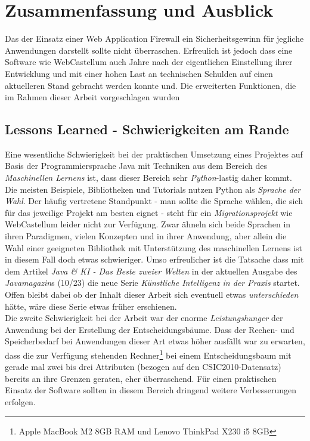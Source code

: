 \chapter{Zusammenfassung und Ausblick}



Das der Einsatz einer Web Application Firewall ein Sicherheitsgewinn für jegliche Anwendungen darstellt sollte nicht überraschen. Erfreulich ist jedoch dass eine Software wie WebCastellum auch Jahre nach der eigentlichen Einstellung ihrer Entwicklung und mit einer hohen Last an technischen Schulden auf einen aktuelleren Stand gebracht werden konnte und. Die erweiterten Funktionen, die im Rahmen dieser Arbeit vorgeschlagen wurden

\section{Lessons Learned - Schwierigkeiten am Rande}
Eine wesentliche Schwierigkeit bei der praktischen Umsetzung eines Projektes auf Basis der Programmiersprache Java mit Techniken aus dem Bereich des \emph{Maschinellen Lernens} ist, dass dieser Bereich sehr \glqq\emph{Python}\grqq-lastig daher kommt. Die meisten Beispiele, Bibliotheken und Tutorials nutzen Python als \emph{Sprache der Wahl}. Der häufig vertretene Standpunkt - man sollte die Sprache wählen, die sich für das jeweilige Projekt am besten eignet - steht für ein \emph{Migrationsprojekt} wie WebCastellum leider nicht zur Verfügung. Zwar ähneln sich beide Sprachen in ihren Paradigmen, vielen Konzepten und in ihrer Anwendung, aber allein die Wahl einer geeigneten Bibliothek mit Unterstützung des maschinellen Lernens ist in diesem Fall doch etwas schwieriger. Umso erfreulicher ist die Tatsache dass mit dem Artikel \glqq\emph{Java \& KI - Das Beste zweier Welten}\grqq{} in der aktuellen Ausgabe des \emph{Javamagazin}s (10/23) die neue Serie \glqq\emph{Künstliche Intelligenz in der Praxis}\grqq{} startet. Offen bleibt dabei ob der Inhalt dieser Arbeit sich eventuell etwas \emph{unterschieden} hätte, wäre diese Serie etwas früher erschienen.\\

Die zweite Schwierigkeit bei der Arbeit war der enorme \emph{Leistungshunger} der Anwendung bei der Erstellung der Entscheidungsbäume. Dass der Rechen- und Speicherbedarf bei Anwendungen dieser Art etwas höher ausfällt war zu erwarten, dass die zur Verfügung stehenden Rechner\footnote{Apple MacBook M2 8GB RAM und Lenovo ThinkPad X230 i5 8GB} bei einem Entscheidungsbaum mit gerade mal zwei bis drei Attributen (bezogen auf den CSIC2010-Datensatz) bereits an ihre Grenzen geraten, eher überraschend. Für einen praktischen Einsatz der Software sollten in diesem Bereich dringend weitere Verbesserungen erfolgen.\\



